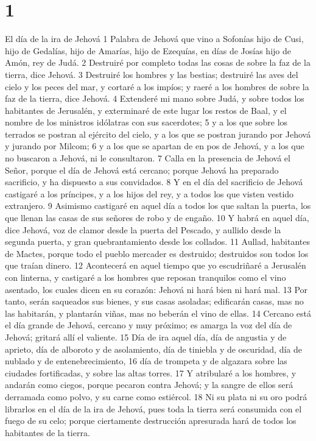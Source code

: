 
\chapter{1}

El día de la ira de Jehová
1 Palabra de Jehová que vino a Sofonías hijo de Cusi, hijo de Gedalías, hijo de Amarías, hijo de Ezequías, en días de Josías hijo de Amón, rey de Judá.
2 Destruiré por completo todas las cosas de sobre la faz de la tierra, dice Jehová.
3 Destruiré los hombres y las bestias; destruiré las aves del cielo y los peces del mar, y cortaré a los impíos; y raeré a los hombres de sobre la faz de la tierra, dice Jehová.
4 Extenderé mi mano sobre Judá, y sobre todos los habitantes de Jerusalén, y exterminaré de este lugar los restos de Baal, y el nombre de los ministros idólatras con sus sacerdotes;
5 y a los que sobre los terrados se postran al ejército del cielo, y a los que se postran jurando por Jehová y jurando por Milcom;
6 y a los que se apartan de en pos de Jehová, y a los que no buscaron a Jehová, ni le consultaron.
7 Calla en la presencia de Jehová el Señor, porque el día de Jehová está cercano; porque Jehová ha preparado sacrificio, y ha dispuesto a sus convidados.
8 Y en el día del sacrificio de Jehová castigaré a los príncipes, y a los hijos del rey, y a todos los que visten vestido extranjero.
9 Asimismo castigaré en aquel día a todos los que saltan la puerta, los que llenan las casas de sus señores de robo y de engaño.
10 Y habrá en aquel día, dice Jehová, voz de clamor desde la puerta del Pescado, y aullido desde la segunda puerta, y gran quebrantamiento desde los collados.
11 Aullad, habitantes de Mactes, porque todo el pueblo mercader es destruido; destruidos son todos los que traían dinero.
12 Acontecerá en aquel tiempo que yo escudriñaré a Jerusalén con linterna, y castigaré a los hombres que reposan tranquilos como el vino asentado, los cuales dicen en su corazón: Jehová ni hará bien ni hará mal. 
13 Por tanto, serán saqueados sus bienes, y sus casas asoladas; edificarán casas, mas no las habitarán, y plantarán viñas, mas no beberán el vino de ellas.
14 Cercano está el día grande de Jehová, cercano y muy próximo; es amarga la voz del día de Jehová; gritará allí el valiente.
15 Día de ira aquel día, día de angustia y de aprieto, día de alboroto y de asolamiento, día de tiniebla y de oscuridad, día de nublado y de entenebrecimiento,
16 día de trompeta y de algazara sobre las ciudades fortificadas, y sobre las altas torres.
17 Y atribularé a los hombres, y andarán como ciegos, porque pecaron contra Jehová; y la sangre de ellos será derramada como polvo, y su carne como estiércol.
18 Ni su plata ni su oro podrá librarlos en el día de la ira de Jehová, pues toda la tierra será consumida con el fuego de su celo; porque ciertamente destrucción apresurada hará de todos los habitantes de la tierra.

